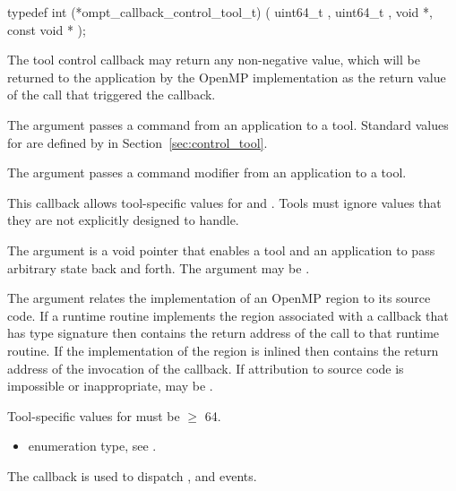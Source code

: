 \format

\begin{ccppspecific}
\begin{omptCallback}
typedef int (*ompt_callback_control_tool_t) (
  uint64_t ,
  uint64_t ,
  void *,
  const void *
);
\end{omptCallback}
\end{ccppspecific}


\descr

The tool control callback may return any non-negative value, which will be returned to the
application by the OpenMP implementation as the return value of the
 call that triggered the callback.

\argdesc

The argument  passes a command from an application
to a tool.  Standard values for  are defined by
 in Section~\ref{sec:control_tool}.

The argument  passes a command modifier from an
application to a tool.

This callback allows tool-specific values for  and
.  Tools must ignore  values that they are
not explicitly designed to handle.

The argument  is a void pointer that enables a tool and
an application to pass arbitrary state back and forth.
The argument  may be .

The  argument relates the implementation of an OpenMP region
to its source code. If a runtime routine implements the region associated with
a callback that has type signature  then
 contains the return address of the call to that runtime routine.
If the implementation of the region is inlined then  contains the
return address of the invocation of the callback. If attribution to source code
is impossible or inappropriate, may be .

\constraints
Tool-specific values for  must be $\geq$ 64.

\crossreferences
\begin{itemize}
\item {} enumeration type, see .
\end{itemize}

\label{sec:ompt_callback_cancel_t}
\summary
The  callback is used to dispatch
,  and  events.

